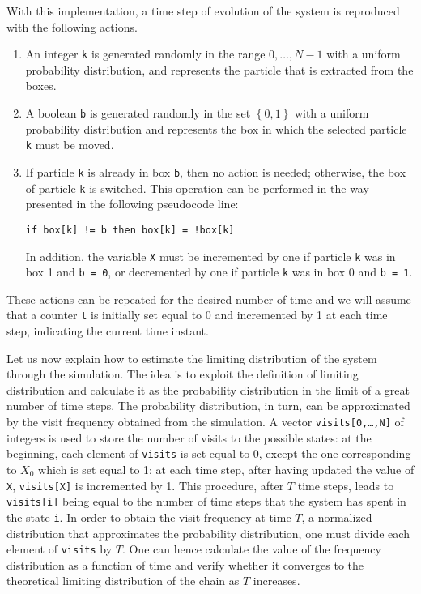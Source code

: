 With this implementation, a time step of evolution of the system is reproduced with the following actions. 

\begin{enumerate}
    \item An integer \texttt{k} is generated randomly in the range $0,\dots, N-1$ with a uniform probability distribution, and represents the particle that is extracted from the boxes.
    \item A boolean \texttt{b} is generated randomly in the set $\left\{0,1\right\}$ with a uniform probability distribution and represents the box in which the selected particle \texttt{k} must be moved.
    \item If particle \texttt{k} is already in box \texttt{b}, then no action is needed; otherwise, the box of particle \texttt{k} is switched. This operation can be performed in the way presented in the following pseudocode line:
    \begin{center}
        \texttt{if box[k] != b then box[k] = !box[k]}
    \end{center}
    In addition, the variable \texttt{X} must be incremented by one if particle \texttt{k} was in box 1 and \texttt{b = 0}, or decremented by one if particle \texttt{k} was in box 0 and \texttt{b = 1}.
\end{enumerate}
These actions can be repeated for the desired number of time and we will assume that a counter \texttt{t} is initially set equal to 0 and incremented by 1 at each time step, indicating the current time instant.

Let us now explain how to estimate the limiting distribution of the system through the simulation. The idea is to exploit the definition of limiting distribution and calculate it as the probability distribution in the limit of a great number of time steps. The probability distribution, in turn, can be approximated by the visit frequency obtained from the simulation. A vector \texttt{visits[0,\dots,N]} of integers is used to store the number of visits to the possible states: at the beginning, each element of \texttt{visits} is set equal to 0, except the one corresponding to $X_0$ which is set equal to 1; at each time step, after having updated the value of \texttt{X}, \texttt{visits[X]} is incremented by 1. This procedure, after $T$ time steps, leads to \texttt{visits[i]} being equal to the number of time steps that the system has spent in the state \texttt{i}. In order to obtain the visit frequency at time $T$, \ie a normalized distribution that approximates the probability distribution, one must divide each element of \texttt{visits} by $T$. One can hence calculate the value of the frequency distribution as a function of time and verify whether it converges to the theoretical limiting distribution of the chain as $T$ increases.

